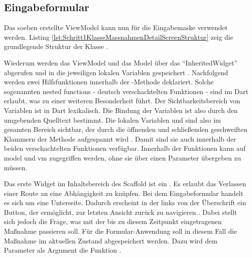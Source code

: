 
\clearpage
\subsection{Eingabeformular}
  
Das soeben erstellte ViewModel kann nun für die Eingabemaske verwendet werden. Listing \ref{lst:Schritt1KlasseMassnahmenDetailScreenStruktur} zeig die grundlegende Struktur der Klasse . 
    
Wiederum werden das ViewModel und das Model über das \enquote{InheritedWidget}  abgerufen und in die jeweiligen lokalen Variablen gespeichert . Nachfolgend werden zwei Hilfsfunktionen innerhalb der -Methode deklariert. Solche sogenannten nested functions - deutsch
verschachtelten Funktionen - sind im Dart erlaubt, was zu einer weiteren Besonderheit führt. Der Sichtbarkeitsbereich von Variablen ist in Dart lexikalisch. Die Bindung der Variablen ist also durch den umgebenden Quelltext bestimmt. Die lokalen Variablen  und  sind also im gesamten Bereich sichtbar, der durch die öffnenden und schließenden geschweiften Klammern der Methode  aufgespannt wird . Damit sind sie auch innerhalb der beiden verschachtelten Funktionen verfügbar. Innerhalb der Funktionen kann auf model und vm zugegriffen werden, ohne sie über einen Parameter übergeben zu müssen. 

Das erste Widget im Inhaltsbereich des Scaffold ist ein . Es erlaubt das Verlassen einer Route an eine Abhängigkeit zu knüpfen. Bei dem Eingabeformular handelt es sich um eine Unterseite. Dadurch erscheint in der   links von der Überschrift ein Button, der ermöglicht, zur letzten Ansicht zurück zu navigieren \Abb{\ref{fig:Schritt1Eingabemaske}}. Dabei stellt sich jedoch die Frage, was mit der bis zu diesem Zeitpunkt eingetragenen Maßnahme passieren soll. Für die Formular-Anwendung soll in diesem Fall die Maßnahme im aktuellen Zustand abgespeichert werden. Dazu wird dem Parameter  als Argument die Funktion . 


